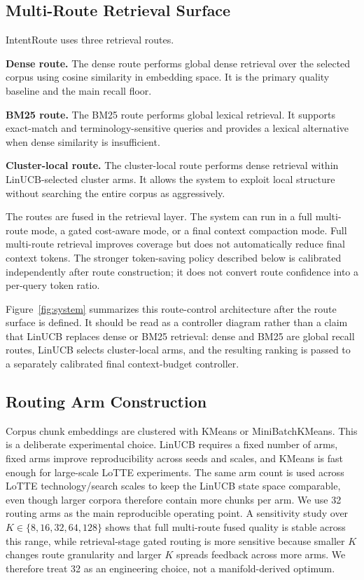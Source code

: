\subsection{Multi-Route Retrieval Surface}
\label{sec:04-method:multi-route-retrieval-surface}

IntentRoute uses three retrieval routes.

\textbf{Dense route.} The dense route performs global dense retrieval over the selected corpus using cosine similarity in embedding space. It is the primary quality baseline and the main recall floor.

\textbf{BM25 route.} The BM25 route performs global lexical retrieval. It supports exact-match and terminology-sensitive queries and provides a lexical alternative when dense similarity is insufficient.

\textbf{Cluster-local route.} The cluster-local route performs dense retrieval within LinUCB-selected cluster arms. It allows the system to exploit local structure without searching the entire corpus as aggressively.

The routes are fused in the retrieval layer. The system can run in a full multi-route mode, a gated cost-aware mode, or a final context compaction mode. Full multi-route retrieval improves coverage but does not automatically reduce final context tokens. The stronger token-saving policy described below is calibrated independently after route construction; it does not convert route confidence into a per-query token ratio.

Figure~\ref{fig:system} summarizes this route-control architecture after the route surface is defined. It should be read as a controller diagram rather than a claim that LinUCB replaces dense or BM25 retrieval: dense and BM25 are global recall routes, LinUCB selects cluster-local arms, and the resulting ranking is passed to a separately calibrated final context-budget controller.

\subsection{Routing Arm Construction}
\label{sec:04-method:routing-arm-construction}

Corpus chunk embeddings are clustered with KMeans or MiniBatchKMeans. This is a deliberate experimental choice. LinUCB requires a fixed number of arms, fixed arms improve reproducibility across seeds and scales, and KMeans is fast enough for large-scale LoTTE experiments. The same arm count is used across LoTTE technology/search scales to keep the LinUCB state space comparable, even though larger corpora therefore contain more chunks per arm. We use 32 routing arms as the main reproducible operating point. A sensitivity study over $K \in \{8,16,32,64,128\}$ shows that full multi-route fused quality is stable across this range, while retrieval-stage gated routing is more sensitive because smaller $K$ changes route granularity and larger $K$ spreads feedback across more arms. We therefore treat 32 as an engineering choice, not a manifold-derived optimum.

